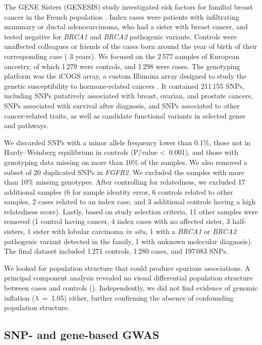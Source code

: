 \documentclass[10pt,letterpaper]{article}
\begin{document}
The GENE Sisters (GENESIS) study investigated risk factors for familial breast cancer in the French population \cite{sinilnikova_genesis:_2016}. Index cases were patients with infiltrating mammary or ductal adenocarcinoma, who had a sister with breast cancer, and tested negative for \emph{BRCA1} and \emph{BRCA2} pathogenic variants. Controls were unaffected colleagues or friends of the cases born around the year of birth of their corresponding case (\textpm{} 3 years). We focused on the 2\,577 samples of European ancestry, of which 1\,279 were controls, and 1\,298 were cases. The genotyping platform was the iCOGS array, a custom Illumina array designed to study the genetic susceptibility to hormone-related cancers \cite{sakoda_turning_2013}. It contained 211\,155 SNPs, including SNPs putatively associated with breast, ovarian, and prostate cancers, SNPs associated with survival after diagnosis, and SNPs associated to other cancer-related traits, as well as candidate functional variants in selected genes and pathways.

We discarded SNPs with a minor allele frequency lower than 0.1\%, those not in Hardy--Weinberg equilibrium in controls (P\=/value \textless~0.001), and those with genotyping data missing on more than 10\% of the samples. We also removed a subset of 20 duplicated SNPs in \emph{FGFR2}. We excluded the samples with more than 10\% missing genotypes. After controlling for relatedness, we excluded 17 additional samples (6 for sample identity error, 6 controls related to other samples, 2 cases related to an index case, and 3 additional controls having a high relatedness score). Lastly, based on study selection criteria, 11 other samples were removed (1 control having cancer, 4 index cases with no affected sister, 3 half-sisters, 1 sister with lobular carcinoma \emph{in situ}, 1 with a \emph{BRCA1} or \emph{BRCA2} pathogenic variant detected in the family, 1 with unknown molecular diagnosis). The final dataset included 1\,271 controls, 1\,280 cases, and 197\,083 SNPs. 

We looked for population structure that could produce spurious associations. A principal component analysis revealed no visual differential population structure between cases and controls (). Independently, we did not find evidence of genomic inflation (\(\lambda\)~=~1.05) either, further confirming the absence of confounding population structure.

\subsection{SNP- and gene-based GWAS}
\label{methods:conventional}
\end{document}
